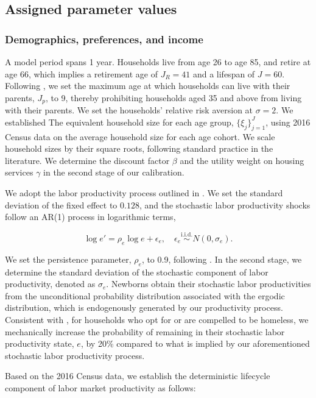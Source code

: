 \documentclass[parskip=full]{article}
\begin{document}
\subsection{Assigned parameter values}

\subsubsection{Demographics, preferences, and income}
A model period spans 1 year. Households live from age 26 to age 85, and retire at age 66, which implies a retirement age of $J_{R}=41$ and a lifespan of $J=60$. Following \citet{rs-2023}, we set the maximum age at which households can live with their parents, $J_{p}$, to 9, thereby prohibiting households aged 35 and above from living with their parents. We set the households' relative risk aversion at $\sigma=2$. We established The equivalent household size for each age group, $\{\xi_{j}\}_{j=1}^{J}$, using 2016 Census data on the average household size for each age cohort. We scale household sizes by their square roots, following standard practice in the literature. We determine the discount factor $\beta$ and the utility weight on housing services $\gamma$ in the second stage of our calibration.

We adopt the labor productivity process outlined in \citet{gkkoc}. We set the standard deviation of the fixed effect to $0.128$, and the stochastic labor productivity shocks follow an AR(1) process in logarithmic terms,

\begin{equation*}
  \log e' = \rho_{e} \log e + \epsilon_{e},\quad \epsilon_{e}\overset{\mathrm{i.i.d.}} \sim N(0,\sigma_{e}).
\end{equation*}

\noindent We set the persistence parameter, $\rho_{e}$, to 0.9, following \citet{gkkoc}. In the second stage, we determine the standard deviation of the stochastic component of labor productivity, denoted as $\sigma_{e}$. Newborns obtain their stochastic labor productivities from the unconditional probability distribution associated with the ergodic distribution, which is endogenously generated by our productivity process. Consistent with \citet{az-2024}, for households who opt for or are compelled to be homeless, we mechanically increase the probability of remaining in their stochastic labor productivity state, $e$, by 20\% compared to what is implied by our aforementioned stochastic labor productivity process.

Based on the 2016 Census data, we establish the deterministic lifecycle component of labor market productivity as follows:
\end{document}
